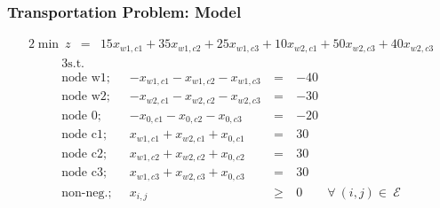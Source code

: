 \documentclass[10pt,handout,notes=show]{beamer}
\begin{document}
\begin{frame}
  \frametitle{Transportation Problem: Model }

  \begin{flushleft}
  \small{
    \begin{alignat*}{2}
    \min\ z     & =& 15x_{w1,c1}+35x_{w1,c2}+25x_{w1,c3} +10x_{w2,c1}+50x_{w2,c3}+40x_{w2,c3}
    \end{alignat*}
    \begin{alignat*}{3}
    \mbox{s.t.} & & & \\
    \mbox{node w1;~~} &  -x_{w1,c1} - x_{w1,c2} - x_{w1,c3} ~&=\ & -40\\
    \mbox{node w2;~~} &  -x_{w2,c1} - x_{w2,c2} - x_{w2,c3} ~&=\ & -30\\
    \mbox{node 0;~~} &  -x_{0,c1} - x_{0,c2} - x_{0,c3} &=\ & -20\\
    \mbox{node c1;~~} &  x_{w1,c1} + x_{w2,c1}+x_{0,c1}  &=\ & 30 \\
    \mbox{node c2;~~} &  x_{w1,c2} + x_{w2,c2}+x_{0,c2}  &=\ & 30 \\
    \mbox{node c3;~~} &  x_{w1,c3} + x_{w2,c3}+x_{0,c3}  &=\ & 30 \\
    \mbox{non-neg.;~~}&  x_{i,j}                            &\geq\ & 0 \qquad \forall\ (i,j) \in\ \mathcal{E}
    \end{alignat*}
  }
  \end{flushleft}

\end{frame}
\end{document}
